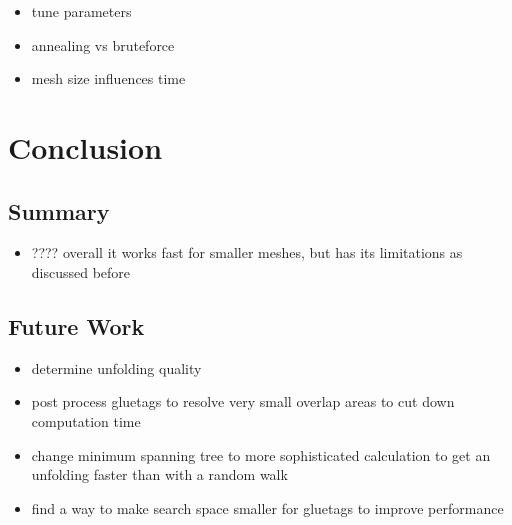 \documentclass[draft,final]{vutinfth} %
\begin{document}
\begin{itemize}
	\item tune parameters
	\item annealing vs bruteforce
	\item mesh size influences time
\end{itemize}

\chapter{Conclusion}

\section{Summary}

\begin{itemize}
	\item ???? overall it works fast for smaller meshes, but has its limitations as discussed before
\end{itemize}

\section{Future Work}

\begin{itemize}
	\item determine unfolding quality
	\item post process gluetags to resolve very small overlap areas to cut down computation time
	\item change minimum spanning tree to more sophisticated calculation to get an unfolding faster than with a random walk
	\item find a way to make search space smaller for gluetags to improve performance
\end{itemize}

\backmatter

\listoffigures %

\cleardoublepage %
\listoftables %

\listofalgorithms
{}

\printindex

\printglossaries



\end{document}
